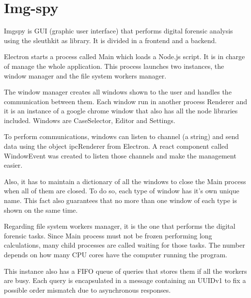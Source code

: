 \chapter{Img-spy}
\label{S:img-spy}

Imgspy is GUI (graphic user interface) that performs digital forensic analysis
using the sleuthkit as library. It is divided in a frontend and a backend. 



Electron starts a process called Main which loads a Node.js script. It is in
charge of manage the whole application. This process launches two instances, the
window manager and the file system workers manager.

The window manager creates all windows shown to the user and handles the
communication between them. Each window run in another process Renderer and it
is an instance of a google chrome window that also has all the  node libraries
included. Windows are CaseSelector, Editor and Settings.

To perform communications, windows can listen to channel (a string) and send
data using the object ipcRenderer from Electron. A react component called
WindowEvent was created to listen those channels and make the management easier.

Also, it has to maintain a dictionary of all the windows to close the Main
process when all of them are closed. To do so, each type of window has it's own
unique name. This fact also guarantees that no more than one window of each type
is shown on the same time. 

Regarding file system workers manager, it is the one that performs the digital
forensic tasks. Since Main process must not be frozen performing long
calculations, many child processes are called waiting for those tasks. The
number depends on how many CPU cores have the computer running the program.

This instance also has a FIFO queue of queries that stores them if all the
workers are busy. Each query is encapsulated in a message containing an UUIDv1
to fix a possible order mismatch due to asynchronous responses.






